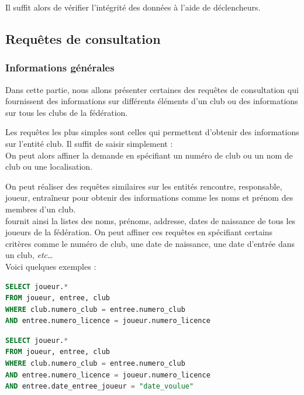 \documentclass[a4paper,12pt]{article}
\begin{document}
Il suffit alors de vérifier l'intégrité des données à l'aide de déclencheurs.

\subsection{Requêtes de consultation}
\subsubsection{Informations générales}
Dans cette partie, nous allons présenter certaines des requêtes de consultation qui fournissent des informations sur différents éléments d'un club ou des informations sur tous les clubs de la fédération.

Les requêtes les plus simples sont celles qui permettent d'obtenir des informations sur l'entité club.
Il suffit de saisir simplement :
\\
On peut alors affiner la demande en spécifiant un numéro de club ou un nom de club ou une localisation.

On peut réaliser des requêtes similaires sur les entités rencontre, responsable, joueur, entraîneur pour obtenir des informations comme les noms et prénom des membres d'un club.\\
 fournit ainsi la listes des noms, prénoms, addresse, dates de naissance de tous les joueurs de la fédération.
On peut affiner ces requêtes en spécifiant certains critères comme le numéro de club, une date de naissance, une date d'entrée dans un club, \textit{etc}\dots\\

Voici quelques exemples :

\begin{lstlisting}[language=SQL, caption=Liste des joueurs d'un club, frame=shadowbox]
SELECT joueur.*
FROM joueur, entree, club
WHERE club.numero_club = entree.numero_club
AND entree.numero_licence = joueur.numero_licence
\end{lstlisting}

\begin{lstlisting}[language=SQL, caption=Liste des joueurs d'un club inscrits avant la «date voulue», frame=shadowbox]
SELECT joueur.*
FROM joueur, entree, club
WHERE club.numero_club = entree.numero_club
AND entree.numero_licence = joueur.numero_licence
AND entree.date_entree_joueur = "date_voulue"
\end{lstlisting}
\end{document}
